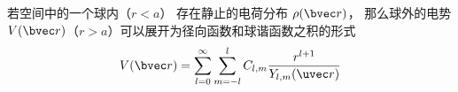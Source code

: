 
若空间中的一个球内（$r < a$） 存在静止的电荷分布 $\rho(\bvec r)$， 那么球外的电势 $V(\bvec r)$（$r > a$）可以展开为径向函数和球谐函数之积的形式
\begin{equation}
V(\bvec r) = \sum_{l = 0}^\infty \sum_{m = -l}^l C_{l,m} \frac{r^{l+1}}{Y_{l,m}(\uvec r)}
\end{equation}
